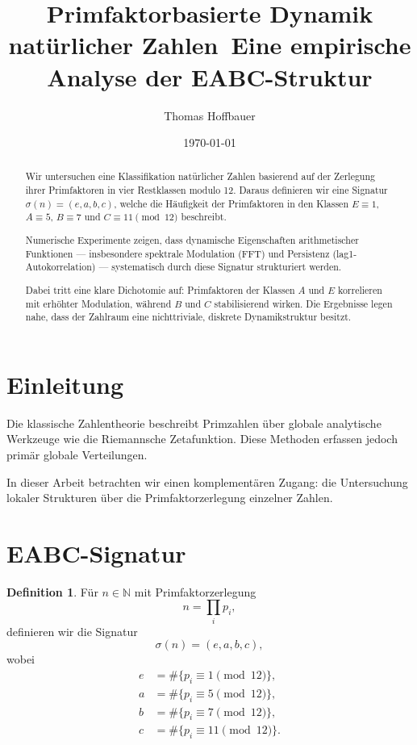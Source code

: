 \documentclass[11pt]{article}
\title{Primfaktorbasierte Dynamik natürlicher Zahlen\
	\large Eine empirische Analyse der EABC-Struktur}
\author{Thomas Hoffbauer}
\date{\today}
\theoremstyle{definition}
\newtheorem{definition}{Definition}
\theoremstyle{remark}
\begin{document}
	\maketitle
	
	\begin{abstract}
		Wir untersuchen eine Klassifikation natürlicher Zahlen basierend auf der Zerlegung ihrer Primfaktoren in vier Restklassen modulo 12. Daraus definieren wir eine Signatur $\sigma(n) = (e,a,b,c)$, welche die Häufigkeit der Primfaktoren in den Klassen $E \equiv 1$, $A \equiv 5$, $B \equiv 7$ und $C \equiv 11 \pmod{12}$ beschreibt.
		
		Numerische Experimente zeigen, dass dynamische Eigenschaften arithmetischer Funktionen — insbesondere spektrale Modulation (FFT) und Persistenz (lag1-Autokorrelation) — systematisch durch diese Signatur strukturiert werden.
		
		Dabei tritt eine klare Dichotomie auf: Primfaktoren der Klassen $A$ und $E$ korrelieren mit erhöhter Modulation, während $B$ und $C$ stabilisierend wirken. Die Ergebnisse legen nahe, dass der Zahlraum eine nichttriviale, diskrete Dynamikstruktur besitzt.
	\end{abstract}
	
	\section{Einleitung}
	
	Die klassische Zahlentheorie beschreibt Primzahlen über globale analytische Werkzeuge wie die Riemannsche Zetafunktion. Diese Methoden erfassen jedoch primär globale Verteilungen.
	
	In dieser Arbeit betrachten wir einen komplementären Zugang: die Untersuchung lokaler Strukturen über die Primfaktorzerlegung einzelner Zahlen.
	
	\section{EABC-Signatur}
	
	\begin{definition}
		Für $n \in \mathbb{N}$ mit Primfaktorzerlegung
		\[
		n = \prod_i p_i,
		\]
		definieren wir die Signatur
		\[
		\sigma(n) = (e,a,b,c),
		\]
		wobei
		\[
		\begin{aligned}
			e &= \#\{p_i \equiv 1 \pmod{12}\}, \\
			a &= \#\{p_i \equiv 5 \pmod{12}\}, \\
			b &= \#\{p_i \equiv 7 \pmod{12}\}, \\
			c &= \#\{p_i \equiv 11 \pmod{12}\}.
		\end{aligned}
		\]
	\end{definition}
	
\end{document}
